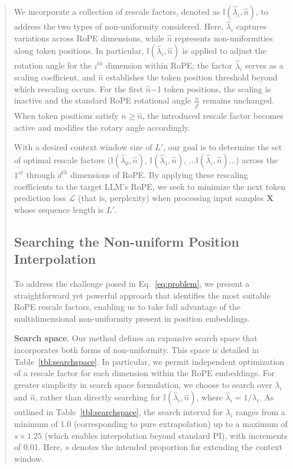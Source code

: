 \begin{abstract}
We incorporate a collection of rescale factors, denoted as $\mathbb{I}(\hat{\lambda}_{i},\hat{n})$, to address the two types of non-uniformity considered. Here, $\hat{\lambda}_i$ captures variations across RoPE dimensions, while $\hat{n}$ represents non-uniformities along token positions. In particular, $\mathbb{I}(\hat{\lambda}_{i},\hat{n})$ is applied to adjust the rotation angle for the $i^{th}$ dimension within RoPE; the factor $\hat{\lambda}_{i}$ serves as a scaling coefficient, and $\hat{n}$ establishes the token position threshold beyond which rescaling occurs. For the first $\hat{n}$−1 token positions, the scaling is inactive and the standard RoPE rotational angle $\frac{n}{\beta^i}$ remains unchanged. When token positions satisfy $n\ge\hat{n}$, the introduced rescale factor becomes active and modifies the rotary angle accordingly.

With a desired context window size of $L'$, our goal is to determine the set of optimal rescale factors ($\mathbb{I}(\hat{\lambda}_{0},\hat{n})$, $\mathbb{I}(\hat{\lambda}_{1},\hat{n})$, ...$\mathbb{I}(\hat{\lambda}_{i},\hat{n})$...) across the $1^{st}$ through $d^{th}$ dimensions of RoPE. By applying these rescaling coefficients to the target $\text{LLM}$’s $\text{RoPE}$, we seek to minimize the next token prediction loss $\mathcal{L}$ (that is, perplexity) when processing input samples $\mathbf{X}$ whose sequence length is $L'$.

\subsection{Searching the Non-uniform Position Interpolation}

To address the challenge posed in Eq.~\ref{eq:problem}, we present a straightforward yet powerful approach that identifies the most suitable RoPE rescale factors, enabling us to take full advantage of the multidimensional non-uniformity present in position embeddings.

\textbf{Search space}. Our method defines an expansive search space that incorporates both forms of non-uniformity. This space is detailed in Table~\ref{tbl:searchspace}. In particular, we permit independent optimization of a rescale factor for each dimension within the RoPE embeddings. For greater simplicity in search space formulation, we choose to search over $\lambda_i$ and $\hat{n}$, rather than directly searching for $\mathbb{I}(\hat{\lambda}_{i},\hat{n})$, where  $\hat{\lambda}_{i}=1/\lambda_i$. 
As outlined in Table~\ref{tbl:searchspace}, the search interval for $\lambda_i$ ranges from a minimum of 1.0 (corresponding to pure extrapolation) up to a maximum of $s\times1.25$ (which enables interpolation beyond standard PI), with increments of 0.01. Here, $s$ denotes the intended proportion for extending the context window.


\end{abstract}
